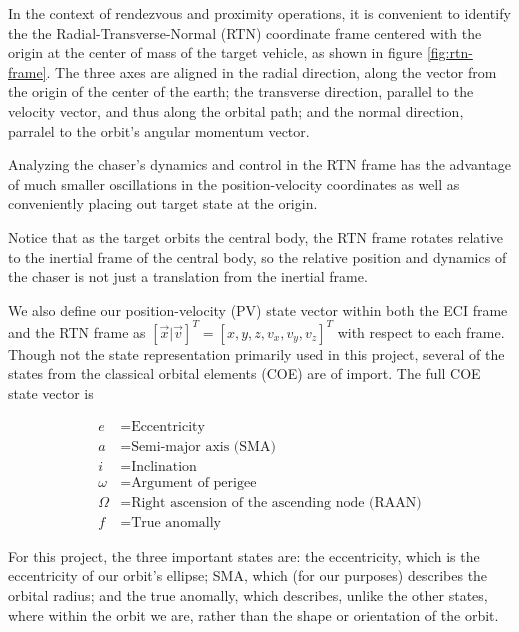 \documentclass[conference]{IEEEtran}
\begin{document}
In the context of rendezvous and proximity operations, it is convenient to
identify the the Radial-Transverse-Normal (RTN) coordinate frame centered with
the origin at the center of mass of the target vehicle, as shown in figure
\ref{fig:rtn-frame}. The three axes are aligned in the radial direction, along
the vector from the origin of the center of the earth; the transverse
direction, parallel to the velocity vector, and thus along the orbital path;
and the normal direction, parralel to the orbit's angular momentum vector.

Analyzing the chaser's dynamics and control in the RTN frame has the advantage
of much smaller oscillations in the position-velocity coordinates as
well as conveniently placing out target state at the origin.

Notice that as the target orbits the central body, the RTN frame rotates
relative to the inertial frame of the central body, so the relative position
and dynamics of the chaser is not just a translation from the inertial frame.

We also define our position-velocity (PV) state vector within both the ECI
frame and the RTN frame as $[\vec{x}|\vec{v}]^T=[x,y,z,v_x,v_y,v_z]^T$ with
respect to each frame. Though not the state representation primarily used in
this project, several of the states from the classical orbital elements (COE)
are of import. The full COE state vector is

\begin{equation}
    \label{eq:coes}
    \begin{split}
        e &= \text{Eccentricity} \\
        a &= \text{Semi-major axis (SMA)} \\
        i &= \text{Inclination} \\
        \omega &= \text{Argument of perigee} \\
        \Omega &= \text{Right ascension of the ascending node (RAAN)} \\
        f &= \text{True anomally}
    \end{split}
\end{equation}

For this project, the three important states are: the eccentricity, which is the
eccentricity of our orbit's ellipse; SMA, which (for our
purposes) describes the orbital radius; and the true anomally, which describes,
unlike the other states, where within the orbit we are, rather than the shape
or orientation of the orbit.
\end{document}
